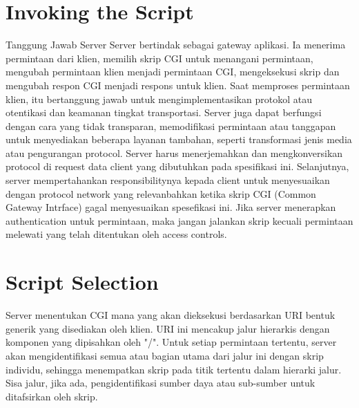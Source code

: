 \documentclass{article}
\begin{document}
\section{Invoking the Script}
Tanggung Jawab Server
Server bertindak sebagai gateway aplikasi. Ia menerima permintaan dari klien, memilih skrip CGI untuk menangani permintaan, mengubah permintaan klien menjadi permintaan CGI, mengeksekusi skrip dan mengubah respon CGI menjadi respons untuk klien. Saat memproses permintaan klien, itu bertanggung jawab untuk mengimplementasikan protokol atau otentikasi dan keamanan tingkat transportasi. Server juga dapat berfungsi dengan cara yang tidak transparan, memodifikasi permintaan atau tanggapan untuk menyediakan beberapa layanan tambahan, seperti transformasi jenis media atau pengurangan protocol.
Server harus menerjemahkan dan mengkonversikan protocol di request data client yang dibutuhkan pada spesifikasi ini. Selanjutnya, server mempertahankan responsibilitynya kepada client untuk menyesuaikan dengan protocol network yang relevanbahkan ketika skrip CGI (Common Gateway Intrface) gagal menyesuaikan spesefikasi ini.
Jika server menerapkan authentication untuk permintaan, maka jangan jalankan skrip kecuali permintaan melewati  yang telah ditentukan oleh access controls.
\section{Script Selection}
Server menentukan CGI mana yang akan dieksekusi berdasarkan URI bentuk generik yang disediakan oleh klien. URI ini mencakup jalur hierarkis dengan komponen yang dipisahkan oleh "/". Untuk setiap permintaan tertentu, server akan mengidentifikasi semua atau bagian utama dari jalur ini dengan skrip individu, sehingga menempatkan skrip pada titik tertentu dalam hierarki jalur. Sisa jalur, jika ada, pengidentifikasi sumber daya atau sub-sumber untuk ditafsirkan oleh skrip.
\end{document}
